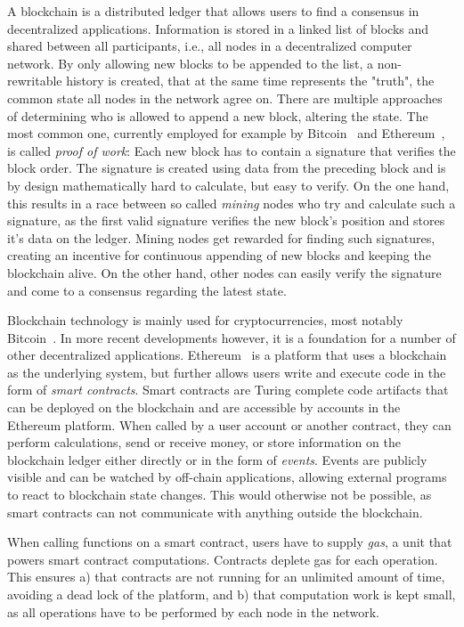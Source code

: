 \documentclass[runningheads]{llncs}
\begin{document}
A blockchain is a distributed ledger that allows users to find a consensus in decentralized applications.
Information is stored in a linked list of blocks and shared between all participants, i.e., all nodes in a decentralized computer network.
By only allowing new blocks to be appended to the list, a non-rewritable history is created, that at the same time represents the "truth", the common state all nodes in the network agree on.
There are multiple approaches of determining who is allowed to append a new block, altering the state.
The most common one, currently employed for example by Bitcoin~\cite{nakamoto2008bitcoin} and Ethereum~\cite{wood2014ethereum}, is called \emph{proof of work}:
Each new block has to contain a signature that verifies the block order.
The signature is created using data from the preceding block and is by design mathematically hard to calculate, but easy to verify.
On the one hand, this results in a race between so called \emph{mining} nodes who try and calculate such a signature, as the first valid signature verifies the new block's position and stores it's data on the ledger.
Mining nodes get rewarded for finding such signatures, creating an incentive for continuous appending of new blocks and keeping the blockchain alive.
On the other hand, other nodes can easily verify the signature and come to a consensus regarding the latest state.

Blockchain technology is mainly used for cryptocurrencies, most notably Bitcoin~\cite{nakamoto2008bitcoin}.
In more recent developments however, it is a foundation for a number of other decentralized applications.
Ethereum~\cite{wood2014ethereum} is a platform that uses a blockchain as the underlying system, but further allows users write and execute code in the form of \emph{smart contracts}.
Smart contracts are Turing complete code artifacts that can be deployed on the blockchain and are accessible by accounts in the Ethereum platform.
When called by a user account or another contract, they can perform calculations, send or receive money, or store information on the blockchain ledger either directly or in the form of \emph{events}.
Events are publicly visible and can be watched by off-chain applications, allowing external programs to react to blockchain state changes.
This would otherwise not be possible, as smart contracts can not communicate with anything outside the blockchain.

When calling functions on a smart contract, users have to supply \emph{gas}, a unit that powers smart contract computations.
Contracts deplete gas for each operation.
This ensures a) that contracts are not running for an unlimited amount of time, avoiding a dead lock of the platform, and b) that computation work is kept small, as all operations have to be performed by each node in the network.
\end{document}
